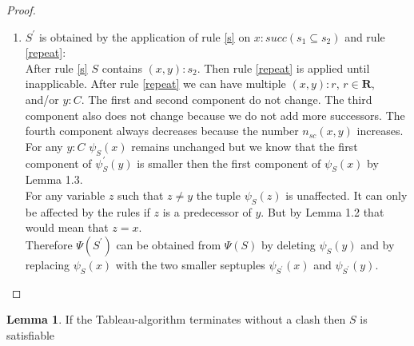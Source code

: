 \documentclass[a4paper,11pt]{scrartcl}
\theoremstyle{break}
\theoremstyle{definition}
\newtheorem{mylem}{Lemma}
\begin{document}
\begin{proof}
\begin{enumerate}
For any variable $z$ such that $z\neq y$. The tuple $\psi_S(z)$ is unaffected. It can only be affected by the rules if $z$ is a predecessor of $y$. But by Lemma 1.2 that would mean that $z=x$.\\
Altogether $\Psi(S^\prime)$ can be obtained from $\Psi(S)$ by replacing $\psi_S(x)$ with the two smaller tuples $\psi_{S^\prime}(x)$ and $\psi_{S^\prime}(y)$.
\item $S^\prime$ is obtained by the application of rule \ref{s} on $x:succ(s_1\subseteq s_2)$ and rule \ref{repeat}:\\ 
After rule \ref{s} $S$ contains $(x,y):s_2$. Then rule \ref{repeat} is applied until inapplicable. After rule \ref{repeat} we can have multiple $(x,y):r$, $r\in\mathbf{R}$, and/or $y:C$. The first and second component do not change. The third component also does not change because we do not add more successors. The fourth component always decreases because the number $n_{sc}(x,y)$ increases. For any $y:C$ $\psi_S(x)$ remains unchanged but we know that the first component of $\psi_S^\prime(y)$ is smaller then the first component of $\psi_S(x)$ by Lemma 1.3.\\
For any variable $z$ such that $z\neq y$ the tuple $\psi_S(z)$ is unaffected. It can only be affected by the rules if $z$ is a predecessor of $y$. But by Lemma 1.2 that would mean that $z=x$.\\
Therefore $\Psi(S^\prime)$ can be obtained from $\Psi(S)$ by deleting $\psi_S(y)$ and by replacing $\psi_S(x)$ with the two smaller septuples $\psi_{S^\prime}(x)$ and $\psi_{S^\prime}(y)$.
\end{enumerate}
\end{proof}
\begin{mylem}
If the Tableau-algorithm terminates without a clash then $S$ is satisfiable
\end{mylem}
\end{document}
